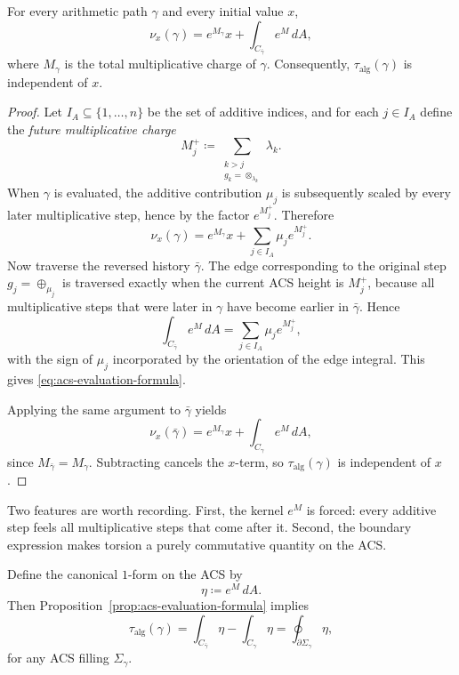 \begin{proposition}\label{prop:acs-evaluation-formula}
For every arithmetic path $\gamma$ and every initial value $x$,
\begin{equation}\label{eq:acs-evaluation-formula}
\nu_x(\gamma)=e^{M_\gamma}x+\int_{C_{\bar\gamma}} e^M\,dA,
\end{equation}
where $M_\gamma$ is the total multiplicative charge of $\gamma$. Consequently, $\tau_{\mathrm{alg}}(\gamma)$ is independent of $x$.
\end{proposition}

\begin{proof}
Let $I_A\subseteq\{1,\dots,n\}$ be the set of additive indices, and for each $j\in I_A$ define the \emph{future multiplicative charge}
\[
M_j^+\coloneqq\sum_{\substack{k>j\\ g_k=\otimes_{\lambda_k}}}\lambda_k.
\]
When $\gamma$ is evaluated, the additive contribution $\mu_j$ is subsequently scaled by every later multiplicative step, hence by the factor $e^{M_j^+}$. Therefore
\[
\nu_x(\gamma)=e^{M_\gamma}x+\sum_{j\in I_A}\mu_j e^{M_j^+}.
\]
Now traverse the reversed history $\bar\gamma$. The edge corresponding to the original step $g_j=\oplus_{\mu_j}$ is traversed exactly when the current ACS height is $M_j^+$, because all multiplicative steps that were later in $\gamma$ have become earlier in $\bar\gamma$. Hence
\[
\int_{C_{\bar\gamma}} e^M\,dA=\sum_{j\in I_A}\mu_j e^{M_j^+},
\]
with the sign of $\mu_j$ incorporated by the orientation of the edge integral. This gives \eqref{eq:acs-evaluation-formula}.

Applying the same argument to $\bar\gamma$ yields
\[
\nu_x(\bar\gamma)=e^{M_\gamma}x+\int_{C_{\gamma}} e^M\,dA,
\]
since $M_{\bar\gamma}=M_\gamma$. Subtracting cancels the $x$-term, so $\tau_{\mathrm{alg}}(\gamma)$ is independent of $x$.
\end{proof}

Two features are worth recording. First, the kernel $e^M$ is forced: every additive step feels all multiplicative steps that come after it. Second, the boundary expression makes torsion a purely commutative quantity on the ACS.

Define the canonical $1$-form on the ACS by
\begin{equation}\label{eq:acs-eta}
\eta\coloneqq e^M\,dA.
\end{equation}
Then Proposition~\ref{prop:acs-evaluation-formula} implies
\begin{equation}\label{eq:acs-tau-boundary}
\tau_{\mathrm{alg}}(\gamma)=\int_{C_{\bar\gamma}}\eta-\int_{C_\gamma}\eta=\oint_{\partial\Sigma_\gamma}\eta,
\end{equation}
for any ACS filling $\Sigma_\gamma$.

